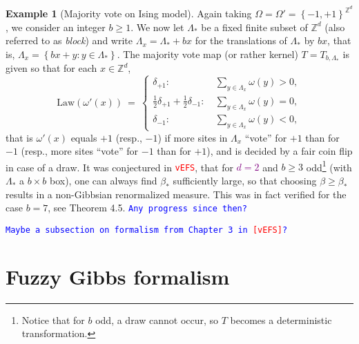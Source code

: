 \documentclass[12pt]{article}
\newcommand{\Z}{\mathbb{Z}}
\newcommand{\set}[1]{\left\{#1\right\}}
\newcommand{\1}{\mathbbm{1}}
\newcommand{\5}{\vspace{0.5cm}}
\theoremstyle{definition}
\newtheorem{ex}[thm]{Example}
\begin{document}
\begin{ex}[Majority vote on Ising model]
Again taking $\Omega=\Omega'=\set{-1,+1}^{\Z^d}$, we consider an integer $b\geq 1$. We now let $\Lambda_*$ be a fixed finite subset of $\Z^d$ (also referred to as \textit{block}) and write $\Lambda_x=\Lambda_*+bx$ for the translations of $\Lambda_*$ by $bx$, that is, $\Lambda_x=\set{bx+y:y\in\Lambda_*}$. The majority vote map (or rather kernel) $T=T_{b,\Lambda_*}$ is given so that for each $x\in\Z^d$,
$$\mathrm{Law}(\omega'(x)) ~=~ \begin{cases}
\delta_{+1}: ~&\sum_{y\in\Lambda_x}\omega(y)>0, \\
\frac{1}{2}\delta_{+1}+\frac{1}{2}\delta_{-1}: ~&\sum_{y\in\Lambda_x}\omega(y)=0, \\
\delta_{-1}: ~&\sum_{y\in\Lambda_x}\omega(y)<0,
\end{cases}$$
that is $\omega'(x)$ equals $+1$ (resp., $-1$) if more sites in $\Lambda_x$ ``vote'' for $+1$ than for $-1$ (resp., more sites ``vote'' for $-1$ than for $+1$), and is decided by a fair coin flip in case of a draw.   It was conjectured in \textcolor{red}{\texttt{vEFS}}, that for \textcolor{purple}{$d=2$} and $b\geq 3$ odd\footnote{Notice that for $b$ odd, a draw cannot occur, so $T$ becomes a deterministic transformation.} (with $\Lambda_*$ a $b\times b$ box), one can always find $\beta_*$ sufficiently large, so that choosing $\beta\geq\beta_*$ results in a non-Gibbsian renormalized measure. This was in fact verified for the case $b=7$, see Theorem 4.5. \textcolor{blue}{\texttt{Any progress since then?}}
\end{ex}

\textcolor{blue}{\texttt{Maybe a subsection on formalism from Chapter 3 in \textcolor{red}{[vEFS]}?}}


\pagebreak


\section{Fuzzy Gibbs formalism}
\end{document}
